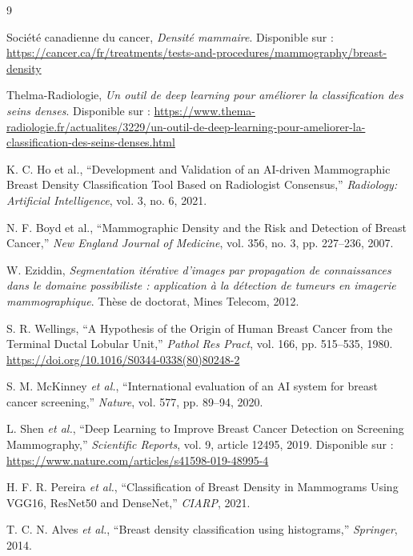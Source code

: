 \documentclass[12pt,a4paper]{report}
\begin{document}
\begin{thebibliography}{9}

Société canadienne du cancer,
\textit{Densité mammaire}.
Disponible sur : \url{https://cancer.ca/fr/treatments/tests-and-procedures/mammography/breast-density}

Thelma-Radiologie,
\textit{Un outil de deep learning pour améliorer la classification des seins denses}.
Disponible sur : \url{https://www.thema-radiologie.fr/actualites/3229/un-outil-de-deep-learning-pour-ameliorer-la-classification-des-seins-denses.html}

K. C. Ho et al.,
``Development and Validation of an AI-driven Mammographic Breast Density Classification Tool Based on Radiologist Consensus,''
\textit{Radiology: Artificial Intelligence}, vol. 3, no. 6, 2021.

N. F. Boyd et al.,
``Mammographic Density and the Risk and Detection of Breast Cancer,''
\textit{New England Journal of Medicine}, vol. 356, no. 3, pp. 227--236, 2007.

W. Eziddin, \textit{Segmentation itérative d'images par propagation de
connaissances dans le domaine possibiliste : application à la détection de
tumeurs en imagerie mammographique}.
Thèse de doctorat, Mines Telecom, 2012.

S. R. Wellings,
``A Hypothesis of the Origin of Human Breast Cancer from the Terminal Ductal Lobular Unit,''
\textit{Pathol Res Pract}, vol. 166, pp. 515--535, 1980.
\url{https://doi.org/10.1016/S0344-0338(80)80248-2}

S. M. McKinney \textit{et al.},
``International evaluation of an AI system for breast cancer screening,''
\textit{Nature}, vol. 577, pp. 89--94, 2020.

L. Shen \textit{et al.},
``Deep Learning to Improve Breast Cancer Detection on Screening Mammography,''
\textit{Scientific Reports}, vol. 9, article 12495, 2019.
Disponible sur : \url{https://www.nature.com/articles/s41598-019-48995-4}

H. F. R. Pereira \textit{et al.},
``Classification of Breast Density in Mammograms Using VGG16, ResNet50 and DenseNet,''
\textit{CIARP}, 2021.

T. C. N. Alves \textit{et al.},
``Breast density classification using histograms,''
\textit{Springer}, 2014.


\end{thebibliography}
\end{document}
